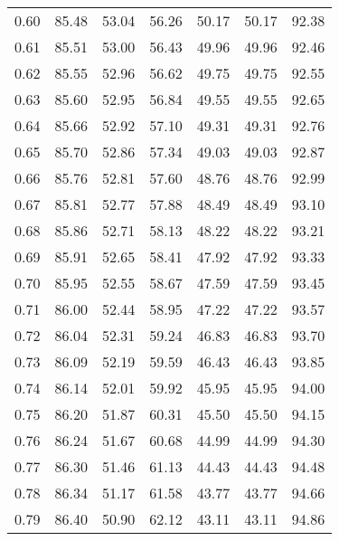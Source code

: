 \begin{tabular}{|c|c|c|c|c|c|c|}
      0.60 &     85.48 &     53.04 &      56.26 &   50.17 &      50.17 &         92.38 \\
      0.61 &     85.51 &     53.00 &      56.43 &   49.96 &      49.96 &         92.46 \\
      0.62 &     85.55 &     52.96 &      56.62 &   49.75 &      49.75 &         92.55 \\
      0.63 &     85.60 &     52.95 &      56.84 &   49.55 &      49.55 &         92.65 \\
      0.64 &     85.66 &     52.92 &      57.10 &   49.31 &      49.31 &         92.76 \\
      0.65 &     85.70 &     52.86 &      57.34 &   49.03 &      49.03 &         92.87 \\
      0.66 &     85.76 &     52.81 &      57.60 &   48.76 &      48.76 &         92.99 \\
      0.67 &     85.81 &     52.77 &      57.88 &   48.49 &      48.49 &         93.10 \\
      0.68 &     85.86 &     52.71 &      58.13 &   48.22 &      48.22 &         93.21 \\
      0.69 &     85.91 &     52.65 &      58.41 &   47.92 &      47.92 &         93.33 \\
      0.70 &     85.95 &     52.55 &      58.67 &   47.59 &      47.59 &         93.45 \\
      0.71 &     86.00 &     52.44 &      58.95 &   47.22 &      47.22 &         93.57 \\
      0.72 &     86.04 &     52.31 &      59.24 &   46.83 &      46.83 &         93.70 \\
      0.73 &     86.09 &     52.19 &      59.59 &   46.43 &      46.43 &         93.85 \\
      0.74 &     86.14 &     52.01 &      59.92 &   45.95 &      45.95 &         94.00 \\
      0.75 &     86.20 &     51.87 &      60.31 &   45.50 &      45.50 &         94.15 \\
      0.76 &     86.24 &     51.67 &      60.68 &   44.99 &      44.99 &         94.30 \\
      0.77 &     86.30 &     51.46 &      61.13 &   44.43 &      44.43 &         94.48 \\
      0.78 &     86.34 &     51.17 &      61.58 &   43.77 &      43.77 &         94.66 \\
      0.79 &     86.40 &     50.90 &      62.12 &   43.11 &      43.11 &         94.86 \\

\end{tabular}
